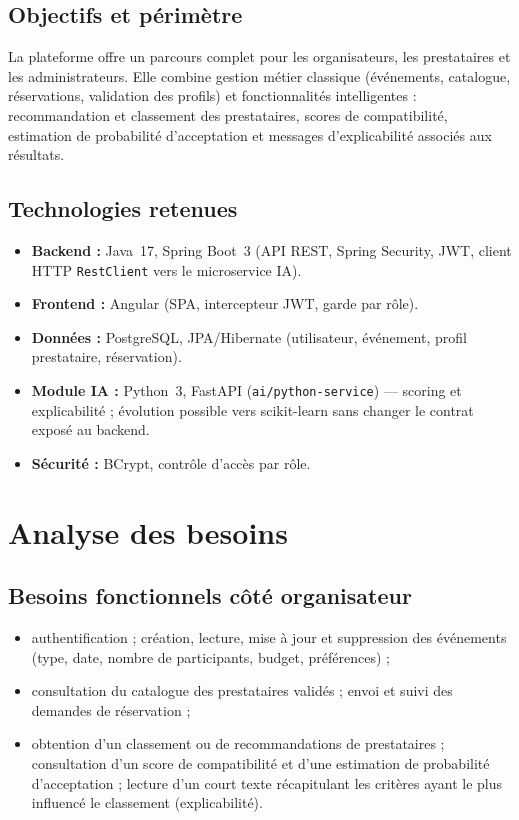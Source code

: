 \documentclass[a4paper,12pt]{report}
\begin{document}
\section{Objectifs et périmètre}

La plateforme offre un parcours complet pour les organisateurs, les prestataires et les administrateurs. Elle combine gestion métier classique (événements, catalogue, réservations, validation des profils) et fonctionnalités intelligentes : recommandation et classement des prestataires, scores de compatibilité, estimation de probabilité d'acceptation et messages d'explicabilité associés aux résultats.

\section{Technologies retenues}

\begin{itemize}[leftmargin=*]
  \item \textbf{Backend :} Java~17, Spring Boot~3 (API REST, Spring Security, JWT, client HTTP \texttt{RestClient} vers le microservice IA).
  \item \textbf{Frontend :} Angular (SPA, intercepteur JWT, garde par rôle).
  \item \textbf{Données :} PostgreSQL, JPA/Hibernate (utilisateur, événement, profil prestataire, réservation).
  \item \textbf{Module IA :} Python~3, FastAPI (\texttt{ai/python-service}) — scoring et explicabilité ; évolution possible vers scikit-learn sans changer le contrat exposé au backend.
  \item \textbf{Sécurité :} BCrypt, contrôle d'accès par rôle.
\end{itemize}

\chapter{Analyse des besoins}
\label{chap:besoins}

\section{Besoins fonctionnels côté organisateur}

\begin{itemize}[leftmargin=*]
  \item authentification ; création, lecture, mise à jour et suppression des événements (type, date, nombre de participants, budget, préférences) ;
  \item consultation du catalogue des prestataires validés ; envoi et suivi des demandes de réservation ;
  \item obtention d'un classement ou de recommandations de prestataires ; consultation d'un score de compatibilité et d'une estimation de probabilité d'acceptation ; lecture d'un court texte récapitulant les critères ayant le plus influencé le classement (explicabilité).
\end{itemize}
\end{document}
